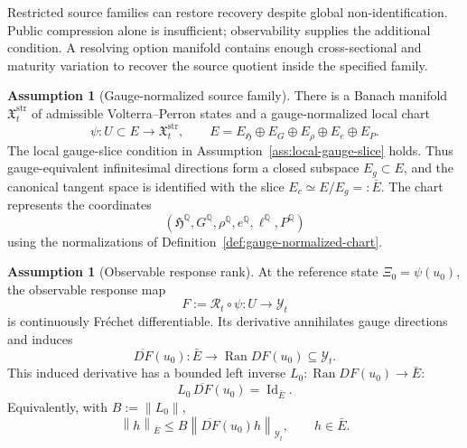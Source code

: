 \documentclass[11pt,a4paper]{amsart}
\theoremstyle{plain}
\theoremstyle{definition}
\newtheorem{assumption}[theorem]{Assumption}
\theoremstyle{remark}
\DeclareMathOperator{\Ran}{Ran}
\DeclareMathOperator{\Id}{Id}
\newcommand{\QQ}{\mathbb{Q}}
\newcommand{\cY}{\mathcal{Y}}
\newcommand{\norm}[1]{\left\lVert #1\right\rVert}
\begin{document}
Restricted source families can restore recovery despite global non-identification.  Public
compression alone is insufficient; observability supplies the additional condition.  A resolving
option manifold contains enough cross-sectional and maturity variation to recover the source quotient
inside the specified family.

\begin{assumption}[Gauge-normalized source family]\label{ass:source-chart}
There is a Banach manifold \(\mathfrak X_t^{\mathrm{str}}\) of admissible Volterra--Perron states
and a gauge-normalized local chart
\[
        \psi:U\subset E\to\mathfrak X_t^{\mathrm{str}},
        \qquad
        E=E_{\mathfrak H}\oplus E_G\oplus E_\rho\oplus E_e\oplus E_P.
\]
The local gauge-slice condition in Assumption~\ref{ass:local-gauge-slice} holds.  Thus
gauge-equivalent infinitesimal directions form a closed subspace \(E_g\subset E\), and the
canonical tangent space is identified with the slice \(E_c\simeq E/E_g=:\bar E\).  The
chart represents the coordinates
\[
        (\mathfrak{H}^\QQ,G^\QQ,\rho^\QQ,e^\QQ,\ell^\QQ,P^\QQ)
\]
using the normalizations of Definition~\ref{def:gauge-normalized-chart}.
\end{assumption}

\begin{assumption}[Observable response rank]\label{ass:full-response}
At the reference state \(\Xi_0=\psi(u_0)\), the observable response map
\[
        F:=\mathcal R_t\circ\psi:U\to\cY_t
\]
is continuously Fr\'echet differentiable.  Its derivative annihilates gauge directions and
induces
\[
        \overline{DF}(u_0):\bar E\to \Ran DF(u_0)\subseteq \cY_t .
\]
This induced derivative has a bounded left inverse \(L_0:\Ran DF(u_0)\to\bar E\):
\[
        L_0\,\overline{DF}(u_0)=\Id_{\bar E}.
\]
Equivalently, with \(B:=\norm{L_0}\),
\[
        \norm{h}_{\bar E}
        \le
        B\norm{\overline{DF}(u_0)h}_{\cY_t},
        \qquad h\in\bar E.
\]
\end{assumption}
\end{document}
